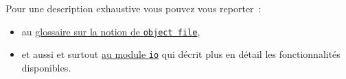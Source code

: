     Pour une description exhaustive vous pouvez vous reporter~:
    
\begin{itemize}
	\item 
	au \href{https://docs.python.org/3/glossary.html\#term-file-object}{glossaire
	sur la notion de \texttt{object\ file}},
	\item
	et aussi et surtout \href{https://docs.python.org/3/library/io.html\#module-io}{au module
	\texttt{io}} qui décrit plus en détail les fonctionnalités disponibles.
\end{itemize}
